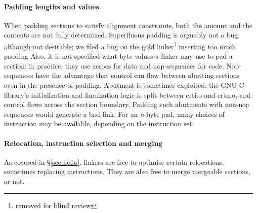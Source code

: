 \paragraph{Padding lengths and values}
When padding sections to satisfy alignment constraints, 
both the amount and the contents are not fully determined.
Superfluous padding is arguably not a bug, although not desirable; 
we filed a bug on the \textsf{gold} linker\footnote{%
removed for blind review} inserting 
too much padding 
Also, it is not specified what byte values a linker may use
to pad a section: in practice, they use zeroes for data and 
nop-sequences for code.
Nop-sequences have the advantage that control can flow between abutting sections
even in the presence of padding. 
Abutment is sometimes exploited: the GNU C library's initialization and finalization logic 
is split between \textsf{crti.o} and \textsf{crtn.o},
and control flows across the section boundary.
Padding such abutments with non-nop sequences would generate a bad link.
For an \textit{n}-byte pad, 
many choices of instruction may be available, 
depending on the instruction set.


\paragraph{Relocation, instruction selection and merging}
As covered in \S\ref{sec:hello}, 
linkers are free to optimise certain relocations, sometimes replacing instructions.
They are also free to merge mergeable sections, or not.


